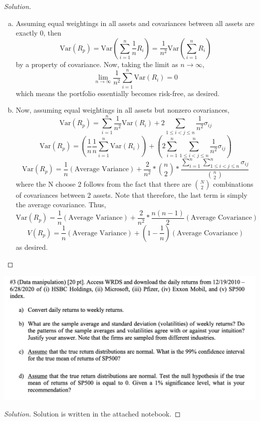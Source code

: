 \documentclass[12pt]{scrartcl}
\newcommand{\V}{\text{Var}}
\begin{document}
\begin{proof}[Solution]
\begin{enumerate}[a.]
\item Assuming equal weightings in all assets and covariances between all assets are exactly 0, 
then 
\[\V(R_p) = \V(\sum_{i=1}^n \frac{1}{n}R_i) = \frac{1}{n^2}\V(\sum_{i=1}^n R_i)\]
by a property of covariance. Now, taking the limit as $n\to\infty$, 
\[\lim_{n\to\infty}\frac{1}{n^2}\sum_{i=1}^n \V(R_i) = 0\]
which means the portfolio essentially becomes risk-free, as desired.

\item Now, assuming equal weightings in all assets but nonzero covariances, 
\[\V(R_p) = \sum_{i=1}^n \frac{1}{n^2} \V(R_i) + 2\sum_{1 \leq i < j \leq n} \frac{1}{n^2}\sigma_{ij}\]
\[\V(R_p) = \left(\frac{1}{n}\frac{1}{n}\sum_{i=1}^n \V(R_i)\right) + \left(2\sum_{i=1}^n \sum_{1 \leq i < j \leq n}^n \frac{1}{n^2}\sigma_{ij}\right)\]
\[\V(R_p) = \frac{1}{n}(\text{Average Variance}) + \frac{2}{n^2} * \binom{n}{2} * \frac{\sum_{i=1}^n \sum_{1 \leq i < j \leq n}^n \sigma_{ij}}{\binom{n}{2}}\]
where the N choose 2 follows from the fact that there are $\binom{N}{2}$ combinations of covariances 
between 2 assets. Note that therefore, the last term is simply the average covariance. 
Thus, 
\[\V(R_p) = \frac{1}{n}(\text{Average Variance}) + \frac{2}{n^2} * \frac{n(n-1)}{2}(\text{Average Covariance})\]
\[V(R_p) = \frac{1}{n}(\text{Average Variance}) + (1 - \frac{1}{n})(\text{Average Covariance})\]
as desired.
\end{enumerate}
  
\end{proof}

\newpage

\includegraphics[width=15cm]{3.png}

\begin{proof}[Solution]

\hfill

Solution is written in the attached notebook.

\end{proof}
\end{document}
